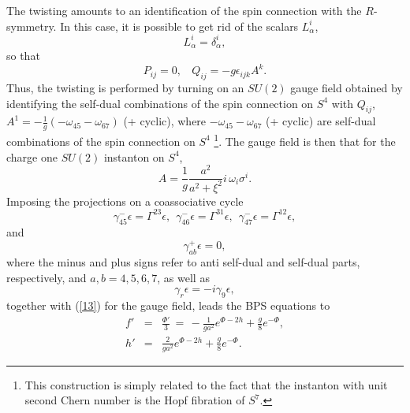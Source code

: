\documentclass[12pt,a4paper]{article}
\begin{document}
The twisting amounts to an identification of the spin connection with the $R$-symmetry. In this case, 
it is possible to get rid of the scalars $L^{i}_{\alpha}$,
\begin{equation}
L^{i}_{\alpha} = \delta_{\alpha}^{i},
\label{10}
\end{equation}
so that
\begin{equation}
P_{ij} = 0, \: \: \: \: Q_{ij} = - g \epsilon_{ijk} A^k.
\label{11}
\end{equation}
Thus, the twisting is performed by turning on an $SU(2)$ gauge field obtained by identifying the self-dual 
combinations of the spin connection on $S^4$ with $Q_{ij}$, 
$A^{1} = - \frac {1}{g} (- \omega_{45} - \omega_{67})$ (+ cyclic), where 
$-\omega_{45}-\omega_{67}$ (+ cyclic) are self-dual combinations of the spin 
connection on $S^4$ \footnote{This construction is simply related to the fact that the instanton with 
unit second Chern number is the Hopf fibration of $S^7$.}. The gauge field is then that 
for the charge one $SU(2)$ instanton on $S^4$,
\begin{equation}
A = \frac {1}{g} \frac {a^2}{a^2 + \xi^2} i \, \omega_i \sigma^{i}.
\label{13}
\end{equation}
Imposing the projections on a coassociative cycle \cite{GLW}
\begin{equation}
\gamma_{45}^- \epsilon = \Gamma^{23} \epsilon, \: \: \gamma_{46}^- \epsilon =
\Gamma^{31} \epsilon, \: \: \gamma_{47}^- \epsilon = \Gamma^{12} \epsilon,
\label{14}
\end{equation}
and 
\begin{equation}
\gamma_{ab}^+ \epsilon = 0,
\label{15}
\end{equation}
where the minus and plus signs refer to anti self-dual and self-dual parts, respectively, and 
$a,b = 4,5,6,7$, as well as
\begin{equation}
\gamma_r \epsilon = - i \gamma_9 \epsilon,
\label{16}
\end{equation}
together with (\ref{13}) for the gauge field, leads the BPS equations to
\begin{eqnarray}
f' \! \! & = & \! \! \frac {\Phi'}{3} \, = \, - \frac {1}{g a^2} e^{\Phi-2h} + 
\frac {g}{8} e^{-\Phi}, \nonumber \\
h' \! \! & = & \! \! \frac {2}{g a^2} e^{\Phi-2h} + \frac {g}{8} e^{-\Phi}.
\label{17}
\end{eqnarray}
  
\end{document}
